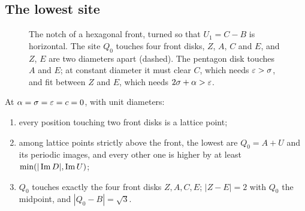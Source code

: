 \subsection{The lowest site}
\begin{figure}[t]
\centering
{}
\caption{The notch of a hexagonal front, turned so that $U_1=C-B$ is horizontal. The site $Q_0$ touches
four front disks, $Z$, $A$, $C$ and $E$, and $Z$, $E$ are two diameters apart (dashed). The pentagon disk
touches $A$ and $E$; at constant diameter it must clear $C$, which needs $\varepsilon>\sigma$, and fit between $Z$
and $E$, which needs $2\sigma+\alpha>\varepsilon$.}\label{fig:hex}
\end{figure}

\begin{lemma}\label{lem:hexsite}
At $\alpha=\sigma=\varepsilon=c=0$, with unit diameters:
\begin{enumerate}
\item[(a)] every position touching two front disks is a lattice point;
\item[(b)] among lattice points strictly above the front, the lowest are $Q_0=A+U$ and its periodic
images, and every other one is higher by at least $\min(|\operatorname{Im} D|,\operatorname{Im} U)$;
\item[(c)] $Q_0$ touches exactly the four front disks $Z,A,C,E$; $|Z-E|=2$ with $Q_0$ the midpoint, and
$|Q_0-B|=\sqrt3$.
\end{enumerate}
\end{lemma}

